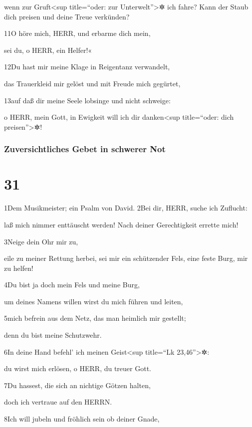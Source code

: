 wenn zur Gruft\textless sup title=``oder: zur Unterwelt''\textgreater✲
ich fahre? Kann der Staub dich preisen und deine Treue verkünden?

11O höre mich, HERR, und erbarme dich mein,

sei du, o HERR, ein Helfer!«

12Du hast mir meine Klage in Reigentanz verwandelt,

das Trauerkleid mir gelöst und mit Freude mich gegürtet,

13auf daß dir meine Seele lobsinge und nicht schweige:

o HERR, mein Gott, in Ewigkeit will ich dir danken\textless sup
title=``oder: dich preisen''\textgreater✲!

\hypertarget{zuversichtliches-gebet-in-schwerer-not}{%
\subsubsection{Zuversichtliches Gebet in schwerer
Not}\label{zuversichtliches-gebet-in-schwerer-not}}

\hypertarget{section-30}{%
\section{31}\label{section-30}}

1Dem Musikmeister; ein Psalm von David. 2Bei dir, HERR, suche ich
Zuflucht:

laß mich nimmer enttäuscht werden! Nach deiner Gerechtigkeit errette
mich!

3Neige dein Ohr mir zu,

eile zu meiner Rettung herbei, sei mir ein schützender Fels, eine feste
Burg, mir zu helfen!

4Du bist ja doch mein Fels und meine Burg,

um deines Namens willen wirst du mich führen und leiten,

5mich befrein aus dem Netz, das man heimlich mir gestellt;

denn du bist meine Schutzwehr.

6In deine Hand befehl' ich meinen Geist\textless sup title=``Lk
23,46''\textgreater✲:

du wirst mich erlösen, o HERR, du treuer Gott.

7Du hassest, die sich an nichtige Götzen halten,

doch ich vertraue auf den HERRN.

8Ich will jubeln und fröhlich sein ob deiner Gnade,

